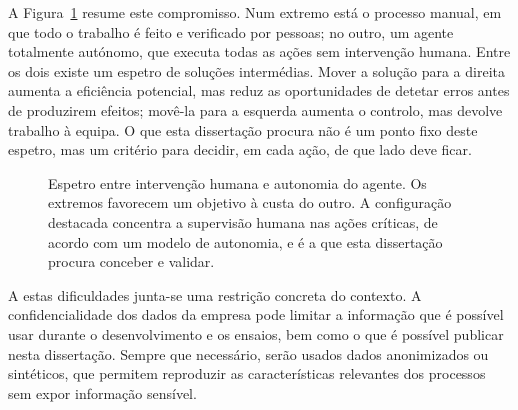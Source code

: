A Figura~\ref{fig:espetro_autonomia} resume este compromisso. Num extremo está o processo manual, em que todo o trabalho é feito e verificado por pessoas; no outro, um agente totalmente autónomo, que executa todas as ações sem intervenção humana. Entre os dois existe um espetro de soluções intermédias. Mover a solução para a direita aumenta a eficiência potencial, mas reduz as oportunidades de detetar erros antes de produzirem efeitos; movê-la para a esquerda aumenta o controlo, mas devolve trabalho à equipa. O que esta dissertação procura não é um ponto fixo deste espetro, mas um critério para decidir, em cada ação, de que lado deve ficar.

\begin{figure}[htbp]
  \centering
  \caption[Espetro entre intervenção humana e autonomia do agente]{Espetro entre intervenção humana e autonomia do agente. Os extremos favorecem um objetivo à custa do outro. A configuração destacada concentra a supervisão humana nas ações críticas, de acordo com um modelo de autonomia, e é a que esta dissertação procura conceber e validar.}
  \label{fig:espetro_autonomia}
\end{figure}

A estas dificuldades junta-se uma restrição concreta do contexto. A confidencialidade dos dados da empresa pode limitar a informação que é possível usar durante o desenvolvimento e os ensaios, bem como o que é possível publicar nesta dissertação. Sempre que necessário, serão usados dados anonimizados ou sintéticos, que permitem reproduzir as características relevantes dos processos sem expor informação sensível.

